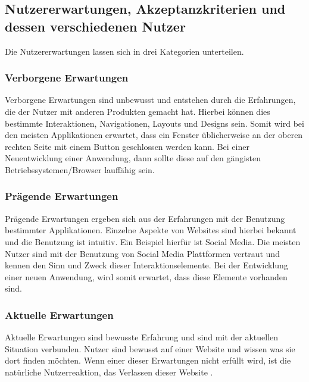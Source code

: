 
\newpage
\subsection{Nutzererwartungen, Akzeptanzkriterien und dessen verschiedenen Nutzer}
Die Nutzererwartungen lassen sich in drei Kategorien unterteilen.
\subsubsection{Verborgene Erwartungen}
Verborgene Erwartungen sind unbewusst und entstehen durch die Erfahrungen, die der Nutzer mit anderen Produkten gemacht hat.
Hierbei können dies bestimmte Interaktionen, Navigationen, Layouts und Designs sein.
Somit wird bei den meisten Applikationen erwartet, dass ein Fenster üblicherweise an der oberen rechten Seite mit einem Button geschlossen werden kann.
Bei einer Neuentwicklung einer Anwendung, dann sollte diese auf den gängisten Betriebssystemen/Browser lauffähig sein. 
\subsubsection{Prägende Erwartungen}
Prägende Erwartungen ergeben sich aus der Erfahrungen mit der Benutzung bestimmter Applikationen.
Einzelne Aspekte von Websites sind hierbei bekannt und die Benutzung ist intuitiv.
Ein Beispiel hierfür ist Social Media.
Die meisten Nutzer sind mit der Benutzung von Social Media Plattformen vertraut und kennen den Sinn und Zweck dieser Interaktionselemente.
Bei der Entwicklung einer neuen Anwendung, wird somit erwartet, dass diese Elemente vorhanden sind.
\subsubsection{Aktuelle Erwartungen}
Aktuelle Erwartungen sind bewusste Erfahrung und sind mit der aktuellen Situation verbunden.
Nutzer sind bewusst auf einer Website und wissen was sie dort finden möchten.
Wenn einer dieser Erwartungen nicht erfüllt wird, ist die natürliche Nutzerreaktion, das Verlassen dieser Website \autocite[vgl.][S. ]{noauthor_user_nodate}.

